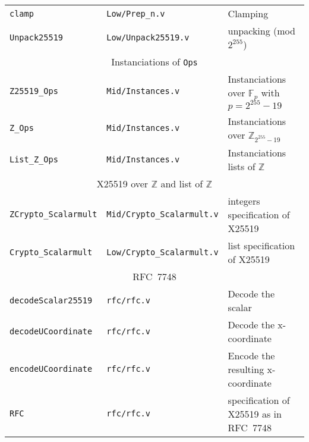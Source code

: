 \documentclass[8pt]{extarticle}
\newcommand{\p}{\ensuremath{2^{255}-19}}
\newcommand{\Zfield}{\ensuremath{\mathbb{Z}_{\p}}}
\newcommand{\Z}{\ensuremath{\mathbb{Z}}\xspace}
\newcommand{\F}[1]{\ensuremath{\mathbb{F}_{#1}}\xspace}
\begin{document}
\begin{table*}[h]
\begin{tabular}{ l | l | l }
    \texttt{clamp} & \texttt{Low/Prep\_n.v} & Clamping \\
    \texttt{Unpack25519} & \texttt{Low/Unpack25519.v} & unpacking (mod $2^{255}$)\\
    \hline
    \multicolumn{3}{c}{Instanciations of \texttt{Ops}}\\
    \hline
    \texttt{Z25519\_Ops} & \texttt{Mid/Instances.v} & Instanciations over \F{p} with $p = \p$\\
    \texttt{Z\_Ops} & \texttt{Mid/Instances.v} & Instanciations over $\Zfield$ \\
    \texttt{List\_Z\_Ops} & \texttt{Mid/Instances.v} & Instanciations lists of \Z \\
    \hline
    \multicolumn{3}{c}{X25519 over \Z and list of \Z}\\
    \hline
    \texttt{ZCrypto\_Scalarmult} & \texttt{Mid/Crypto\_Scalarmult.v} & integers specification of X25519\\
    \texttt{Crypto\_Scalarmult} & \texttt{Low/Crypto\_Scalarmult.v} & list specification of X25519\\
    \hline
    \multicolumn{3}{c}{RFC~7748}\\
    \hline
    \texttt{decodeScalar25519} & \texttt{rfc/rfc.v} & Decode the scalar\\
    \texttt{decodeUCoordinate} & \texttt{rfc/rfc.v} & Decode the x-coordinate\\
    \texttt{encodeUCoordinate} & \texttt{rfc/rfc.v} & Encode the resulting x-coordinate\\
    \texttt{RFC} & \texttt{rfc/rfc.v} & specification of X25519 as in RFC~7748\\
    \hline
\end{tabular}
\end{table*}
\end{document}
